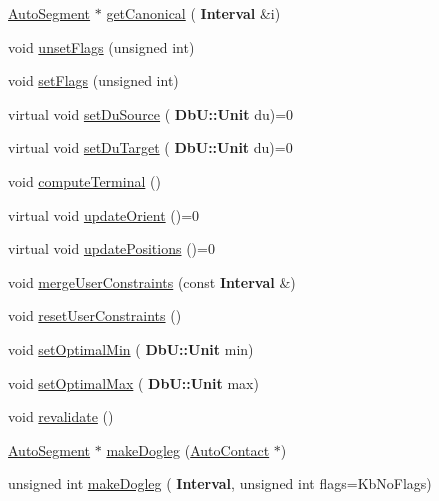 \begin{DoxyCompactItemize}
\hyperlink{classKatabatic_1_1AutoSegment}{Auto\+Segment} $\ast$ \hyperlink{classKatabatic_1_1AutoSegment_a988beca5780421c168a2475a5298009a}{get\+Canonical} (\textbf{ Interval} \&i)
\item 
void \hyperlink{classKatabatic_1_1AutoSegment_a1a6fac115cb81db48e3ac9ffa0721bb5}{unset\+Flags} (unsigned int)
\item 
void \hyperlink{classKatabatic_1_1AutoSegment_aeb14f94914af58657a0dc2f50ec98df5}{set\+Flags} (unsigned int)
\item 
virtual void \hyperlink{classKatabatic_1_1AutoSegment_aaf60d18ab6d951a34a3d06959ce2e76f}{set\+Du\+Source} (\textbf{ Db\+U\+::\+Unit} du)=0
\item 
virtual void \hyperlink{classKatabatic_1_1AutoSegment_a246756d4c8b3e094a0a9d6de3c2109ff}{set\+Du\+Target} (\textbf{ Db\+U\+::\+Unit} du)=0
\item 
void \hyperlink{classKatabatic_1_1AutoSegment_abc72aaeefa7450eaf67aee3212ec974d}{compute\+Terminal} ()
\item 
virtual void \hyperlink{classKatabatic_1_1AutoSegment_a102e0f4bbb0386e41be214d15a9e4549}{update\+Orient} ()=0
\item 
virtual void \hyperlink{classKatabatic_1_1AutoSegment_a6d95f4de39c13611786c95ddc7b8942e}{update\+Positions} ()=0
\item 
void \hyperlink{classKatabatic_1_1AutoSegment_ae82ffef92ad9ffdc5da5e0c1830d9537}{merge\+User\+Constraints} (const \textbf{ Interval} \&)
\item 
void \hyperlink{classKatabatic_1_1AutoSegment_ac8768352909d37ebad1c06c9cf4ef8bb}{reset\+User\+Constraints} ()
\item 
void \hyperlink{classKatabatic_1_1AutoSegment_af92b3d000552b630695879dd5d4736a1}{set\+Optimal\+Min} (\textbf{ Db\+U\+::\+Unit} min)
\item 
void \hyperlink{classKatabatic_1_1AutoSegment_a90173ab4f35b98c6544f9482ccd93b5e}{set\+Optimal\+Max} (\textbf{ Db\+U\+::\+Unit} max)
\item 
void \hyperlink{classKatabatic_1_1AutoSegment_a88ac40c065bce0ff97792d18b41b6a67}{revalidate} ()
\item 
\hyperlink{classKatabatic_1_1AutoSegment}{Auto\+Segment} $\ast$ \hyperlink{classKatabatic_1_1AutoSegment_a39c927c04b5016770692b9b8448c2f04}{make\+Dogleg} (\hyperlink{classKatabatic_1_1AutoContact}{Auto\+Contact} $\ast$)
\item 
unsigned int \hyperlink{classKatabatic_1_1AutoSegment_a5ca22c853ee33a2b26367eaf29457766}{make\+Dogleg} (\textbf{ Interval}, unsigned int flags=Kb\+No\+Flags)

\end{DoxyCompactItemize}
